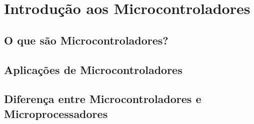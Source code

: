 \section{Introdução aos Microcontroladores}

\subsection{O que são Microcontroladores?}
\subsection{Aplicações de Microcontroladores}
\subsection{Diferença entre Microcontroladores e Microprocessadores}